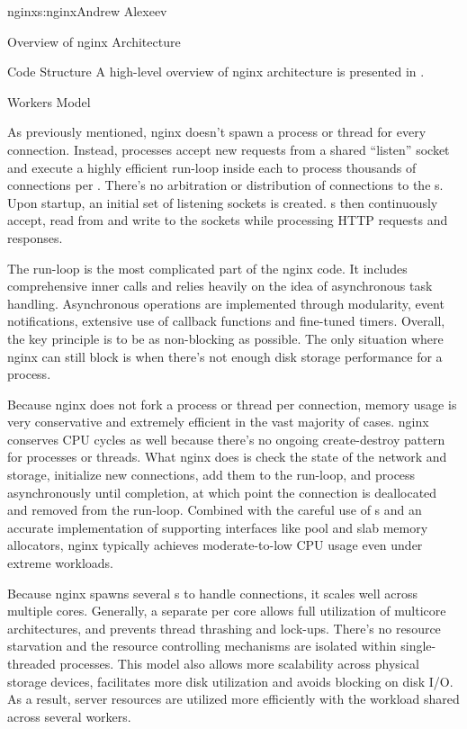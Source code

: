 \begin{aosachapter}{nginx}{s:nginx}{Andrew Alexeev}
\begin{aosasect1}{Overview of nginx Architecture}
\begin{aosasect2}{Code Structure}
A high-level overview of nginx architecture is presented in
.


\end{aosasect2}

\begin{aosasect2}{Workers Model}

As previously mentioned, nginx doesn't spawn a process or thread for
every connection. Instead,  processes accept new requests
from a shared ``listen'' socket and execute a highly efficient
run-loop inside each  to process thousands of connections
per . There's no arbitration or distribution of
connections to the s. Upon startup, an initial set of
listening sockets is created. s then continuously accept,
read from and write to the sockets while processing HTTP requests and
responses.

The run-loop is the most complicated part of the nginx 
code. It includes comprehensive inner calls and relies heavily on the
idea of asynchronous task handling. Asynchronous operations are
implemented through modularity, event notifications, extensive use of
callback functions and fine-tuned timers. Overall, the key principle
is to be as non-blocking as possible. The only situation where nginx
can still block is when there's not enough disk storage performance
for a  process.

Because nginx does not fork a process or thread per connection, memory
usage is very conservative and extremely efficient in the vast
majority of cases. nginx conserves CPU cycles as well because there's
no ongoing create-destroy pattern for processes or threads. What nginx
does is check the state of the network and storage, initialize new
connections, add them to the run-loop, and process asynchronously
until completion, at which point the connection is deallocated and
removed from the run-loop. Combined with the careful use of
s and an accurate implementation of supporting
interfaces like pool and slab memory allocators, nginx typically
achieves moderate-to-low CPU usage even under extreme workloads.

Because nginx spawns several s to handle connections, it
scales well across multiple cores. Generally, a separate 
per core allows full utilization of multicore architectures, and
prevents thread thrashing and lock-ups. There's no resource starvation
and the resource controlling mechanisms are isolated within
single-threaded  processes. This model also allows more
scalability across physical storage devices, facilitates more disk
utilization and avoids blocking on disk I/O. As a result, server
resources are utilized more efficiently with the workload shared
across several workers.


\end{aosasect2}
\end{aosasect1}
\end{aosachapter}
